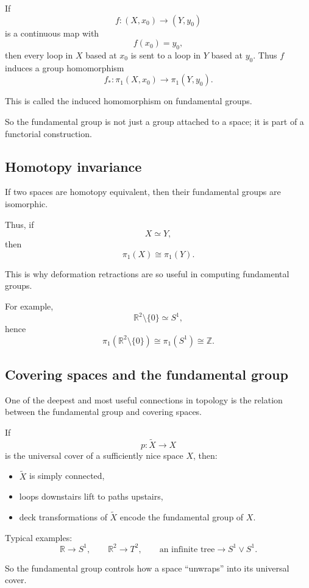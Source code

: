 \documentclass[12pt,a4paper]{article}
\theoremstyle{notespace}
\begin{document}
If
\[
f:(X,x_0)\to (Y,y_0)
\]
is a continuous map with
\[
f(x_0)=y_0,
\]
then every loop in \(X\) based at \(x_0\) is sent to a loop in \(Y\) based at \(y_0\). Thus \(f\) induces a group homomorphism
\[
f_*:\pi_1(X,x_0)\to \pi_1(Y,y_0).
\]

This is called the induced homomorphism on fundamental groups.

So the fundamental group is not just a group attached to a space; it is part of a functorial construction.

\bigskip

\subsection{Homotopy invariance}

If two spaces are homotopy equivalent, then their fundamental groups are isomorphic.

Thus, if
\[
X\simeq Y,
\]
then
\[
\pi_1(X)\cong \pi_1(Y).
\]

This is why deformation retractions are so useful in computing fundamental groups.

For example,
\[
\mathbb R^2\setminus\{0\}\simeq S^1,
\]
hence
\[
\pi_1(\mathbb R^2\setminus\{0\})\cong \pi_1(S^1)\cong \mathbb Z.
\]

\bigskip

\subsection{Covering spaces and the fundamental group}

One of the deepest and most useful connections in topology is the relation between the fundamental group and covering spaces.

If
\[
p:\widetilde X\to X
\]
is the universal cover of a sufficiently nice space \(X\), then:
\begin{itemize}
	\item \(\widetilde X\) is simply connected,
	\item loops downstairs lift to paths upstairs,
	\item deck transformations of \(\widetilde X\) encode the fundamental group of \(X\).
\end{itemize}

Typical examples:
\[
\mathbb R \to S^1,
\qquad
\mathbb R^2\to T^2,
\qquad
\text{an infinite tree}\to S^1\vee S^1.
\]

So the fundamental group controls how a space ``unwraps'' into its universal cover.
\end{document}
